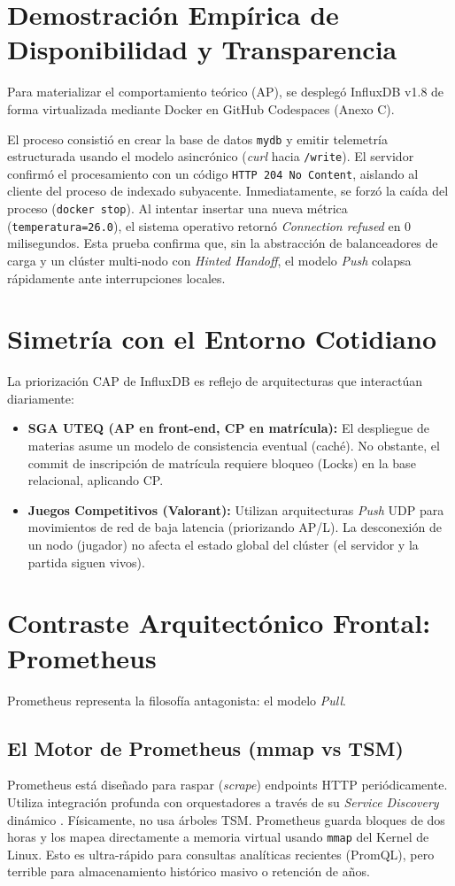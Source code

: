 \documentclass[12pt,a4paper]{article}
\begin{document}
\section{Demostración Empírica de Disponibilidad y Transparencia}
Para materializar el comportamiento teórico (AP), se desplegó InfluxDB v1.8 de forma virtualizada mediante Docker en GitHub Codespaces (Anexo C). 

El proceso consistió en crear la base de datos \texttt{mydb} y emitir telemetría estructurada usando el modelo asincrónico (\textit{curl} hacia \texttt{/write}). El servidor confirmó el procesamiento con un código \texttt{HTTP 204 No Content}, aislando al cliente del proceso de indexado subyacente. Inmediatamente, se forzó la caída del proceso (\texttt{docker stop}). Al intentar insertar una nueva métrica (\texttt{temperatura=26.0}), el sistema operativo retornó \textit{Connection refused} en 0 milisegundos. Esta prueba confirma que, sin la abstracción de balanceadores de carga y un clúster multi-nodo con \textit{Hinted Handoff}, el modelo \textit{Push} colapsa rápidamente ante interrupciones locales.

\section{Simetría con el Entorno Cotidiano}
La priorización CAP de InfluxDB es reflejo de arquitecturas que interactúan diariamente:
\begin{itemize}
    \item \textbf{SGA UTEQ (AP en front-end, CP en matrícula):} El despliegue de materias asume un modelo de consistencia eventual (caché). No obstante, el commit de inscripción de matrícula requiere bloqueo (Locks) en la base relacional, aplicando CP.
    \item \textbf{Juegos Competitivos (Valorant):} Utilizan arquitecturas \textit{Push} UDP para movimientos de red de baja latencia (priorizando AP/L). La desconexión de un nodo (jugador) no afecta el estado global del clúster (el servidor y la partida siguen vivos).
\end{itemize}

\section{Contraste Arquitectónico Frontal: Prometheus}
Prometheus representa la filosofía antagonista: el modelo \textit{Pull}.

\subsection{El Motor de Prometheus (mmap vs TSM)}
Prometheus está diseñado para raspar (\textit{scrape}) endpoints HTTP periódicamente. Utiliza integración profunda con orquestadores a través de su \textit{Service Discovery} dinámico \cite{ford2021}. Físicamente, no usa árboles TSM. Prometheus guarda bloques de dos horas y los mapea directamente a memoria virtual usando \texttt{mmap} del Kernel de Linux. Esto es ultra-rápido para consultas analíticas recientes (PromQL), pero terrible para almacenamiento histórico masivo o retención de años.
\end{document}
